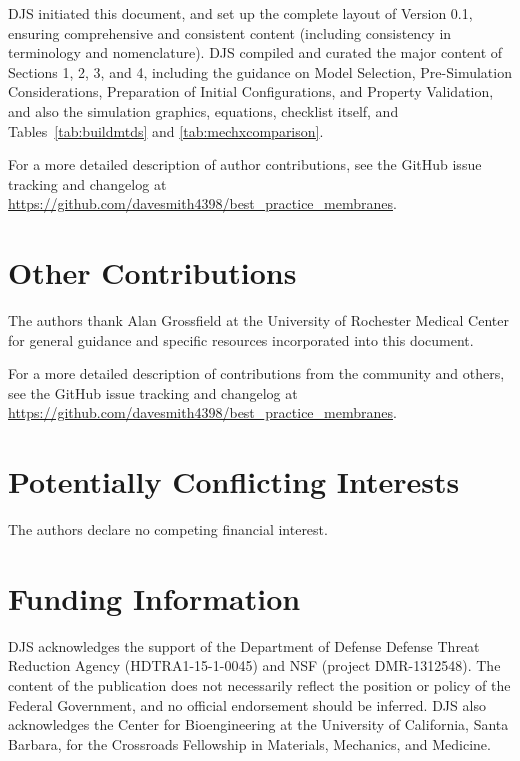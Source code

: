 \documentclass[9pt,bestpractices]{livecoms}
\newcommand{\githubrepository}{\url{https://github.com/davesmith4398/best_practice_membranes}}  %
\begin{document}
DJS initiated this document, and set up the complete layout of Version 0.1, ensuring comprehensive and consistent content (including consistency in terminology and nomenclature). DJS compiled and curated the major content of Sections 1, 2, 3, and 4, including the guidance on Model Selection, Pre-Simulation Considerations, Preparation of Initial Configurations, and Property Validation, and also the simulation graphics, equations, checklist itself, and Tables~\ref{tab:buildmtds} and \ref{tab:mechxcomparison}.

For a more detailed description of author contributions,
see the GitHub issue tracking and changelog at \githubrepository.

\section{Other Contributions}
%

The authors thank Alan Grossfield at the University of Rochester Medical Center for general guidance and specific resources incorporated into this document.

For a more detailed description of contributions from the community and others, see the GitHub issue tracking and changelog at \githubrepository.

\section{Potentially Conflicting Interests}

The authors declare no competing financial interest.

\section{Funding Information}
DJS acknowledges the support of the Department of Defense Defense Threat Reduction Agency (HDTRA1-15-1-0045) and NSF (project DMR-1312548).
The content of the publication does not necessarily reflect the position or policy of the Federal Government, and no official endorsement should be inferred.
DJS also acknowledges the Center for Bioengineering at the University of California, Santa Barbara, for the Crossroads Fellowship in Materials, Mechanics, and Medicine.

\medskip

%



\end{document}
